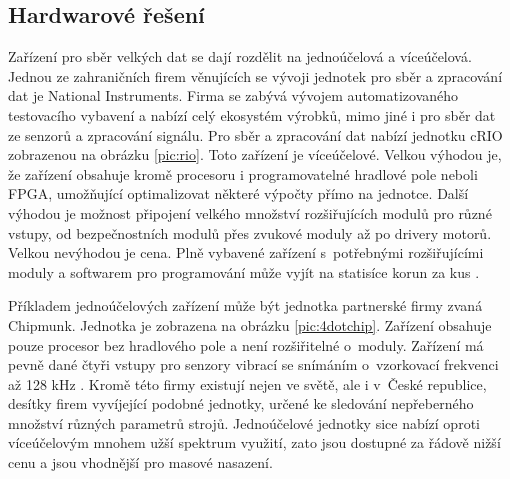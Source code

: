 \subsection{Hardwarové řešení}
Zařízení pro sběr velkých dat se dají rozdělit na jednoúčelová a víceúčelová. Jednou ze zahraničních firem věnujících se vývoji jednotek pro sběr a zpracování dat je National Instruments. Firma se zabývá vývojem automatizovaného testovacího vybavení a nabízí celý ekosystém výrobků, mimo jiné i pro sběr dat ze senzorů a zpracování signálu. Pro sběr a zpracování dat nabízí jednotku cRIO zobrazenou na obrázku \ref{pic:rio}. Toto zařízení je víceúčelové. Velkou výhodou je, že zařízení obsahuje kromě procesoru i programovatelné hradlové pole neboli FPGA, umožňující optimalizovat některé výpočty přímo na jednotce. Další výhodou je možnost připojení velkého množství rozšiřujících modulů pro různé vstupy, od bezpečnostních modulů přes zvukové moduly až po drivery motorů. Velkou nevýhodou je cena. Plně vybavené zařízení s~potřebnými rozšiřujícími moduly a softwarem pro programování může vyjít na statisíce korun za kus \cite{rio}.

Příkladem jednoúčelových zařízení může být jednotka partnerské firmy zvaná Chipmunk. Jednotka je zobrazena na obrázku \ref{pic:4dotchip}. Zařízení obsahuje pouze procesor bez hradlového pole a není rozšiřitelné o~moduly. Zařízení má pevně dané čtyři vstupy pro senzory vibrací se snímáním o~vzorkovací frekvenci až 128 kHz \cite{4dotchipmunk}. Kromě této firmy existují nejen ve světě, ale i v~České republice, desítky firem vyvíjející podobné jednotky, určené ke sledování nepřeberného množství různých parametrů strojů. Jednoúčelové jednotky sice nabízí oproti víceúčelovým mnohem užší spektrum využití, zato jsou dostupné za řádově nižší cenu a jsou vhodnější pro masové nasazení.

